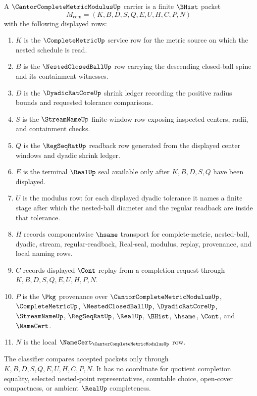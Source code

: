 \begin{definition}
\label{def:cantor-complete-metric-modulus-carrier}
A $\CantorCompleteMetricModulusUp$ carrier is a finite $\BHist$ packet
$$
M_{\mathrm{ccm}}=(K,B,D,S,Q,E,U,H,C,P,N)
$$
with the following displayed rows:
\begin{enumerate}
\item $K$ is the $\CompleteMetricUp$ service row for the metric source on which the nested schedule is read.
\item $B$ is the $\NestedClosedBallUp$ row carrying the descending closed-ball spine and its containment witnesses.
\item $D$ is the $\DyadicRatCoreUp$ shrink ledger recording the positive radius bounds and requested tolerance comparisons.
\item $S$ is the $\StreamNameUp$ finite-window row exposing inspected centers, radii, and containment checks.
\item $Q$ is the $\RegSeqRatUp$ readback row generated from the displayed center windows and dyadic shrink ledger.
\item $E$ is the terminal $\RealUp$ seal available only after $K,B,D,S,Q$ have been displayed.
\item $U$ is the modulus row: for each displayed dyadic tolerance it names a finite stage after which the nested-ball diameter and the regular readback are inside that tolerance.
\item $H$ records componentwise $\hsame$ transport for complete-metric, nested-ball, dyadic, stream, regular-readback, Real-seal, modulus, replay, provenance, and local naming rows.
\item $C$ records displayed $\Cont$ replay from a completion request through $K,B,D,S,Q,E,U,H,P,N$.
\item $P$ is the $\Pkg$ provenance over $\CantorCompleteMetricModulusUp$, $\CompleteMetricUp$, $\NestedClosedBallUp$, $\DyadicRatCoreUp$, $\StreamNameUp$, $\RegSeqRatUp$, $\RealUp$, $\BHist$, $\hsame$, $\Cont$, and $\NameCert$.
\item $N$ is the local $\NameCert_{\CantorCompleteMetricModulusUp}$ row.
\end{enumerate}
The classifier compares accepted packets only through $K,B,D,S,Q,E,U,H,C,P,N$. It has no coordinate for quotient completion equality, selected nested-point representatives, countable choice, open-cover compactness, or ambient $\RealUp$ completeness.
\end{definition}

